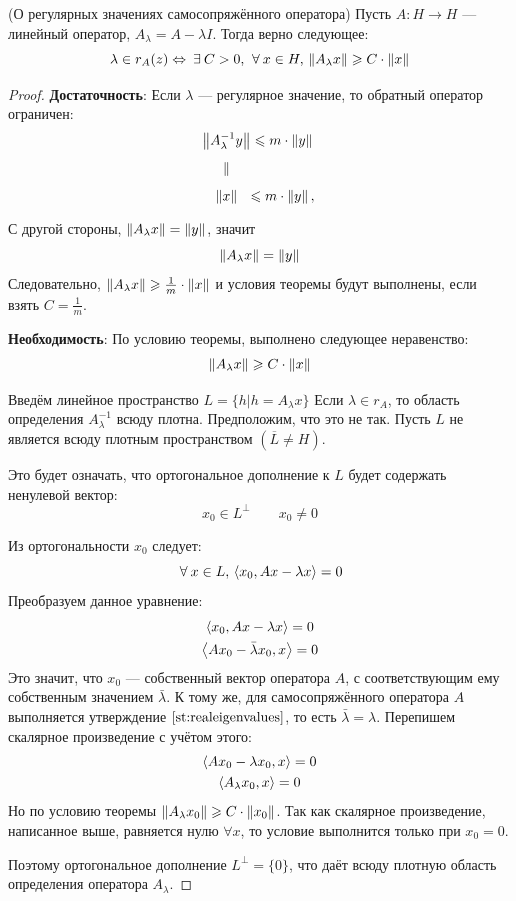\documentclass[12pt]{article}
\begin{document}
	\begin{theorem}
		(О регулярных значениях самосопряжённого оператора) Пусть $A: H \rightarrow H$ --- линейный оператор, 
		$A_{\lambda} = A - \lambda I$. Тогда верно следующее:
		$$\lambda \in r_{A}(z) \Leftrightarrow \exists C > 0,\, \forall x \in H,\, \norm{A_{\lambda}x} \geq C\cdot\norm{x}$$
	\end{theorem}
	\begin{proof}
		\textbf{Достаточность}: 
		Если $\lambda$ --- регулярное значение, то обратный оператор ограничен:
		$$
		\begin{CD}
			\norm{A_{\lambda}^{-1}y} @.\leq m\cdot\norm{y} \\
			\parallel \\		
			\norm{x} @.\leq m\cdot\norm{y},\,
		\end{CD}
		$$
		
		С другой стороны, $\left\| A_{\lambda}x \right\| = \left\| y \right\|$, значит
		$$\left\| A_{\lambda}x \right\| = \left\| y \right\|$$
		Следовательно, $\left\| A_{\lambda}x \right\|\geqslant\frac{1}{m}\cdot\left\| x \right\|$ и условия теоремы будут выполнены, если взять
		$C = \frac{1}{m}$.
		
		\textbf{Необходимость}: 
		По условию теоремы, выполнено следующее неравенство:
		$$\left\| A_{\lambda}x \right\| \geqslant C\cdot\left\| x \right\|$$
		
		Введём линейное пространство $L = \{ h|h=A_{\lambda}x\}$ Если $\lambda \in r_A$, то область определения
		$A_{\lambda}^{-1}$ всюду плотна. Предположим, что это не так. Пусть $L$ не 
		является всюду плотным пространством $\left(\overline{L}\neq H\right)$.
		
		Это будет означать, что ортогональное дополнение к $L$ будет содержать ненулевой вектор:
		$$x_0 \in L^{\perp} \qquad x_0 \neq 0$$
		
		Из ортогональности $x_0$ следует:
		$$\forall x\in L,\, \scal{x_0}{Ax - \lambda x} = 0$$
		Преобразуем данное уравнение:
		\begin{gather*}
			\left\langle x_0, Ax - \lambda x \right\rangle = 0 \\
			\left\langle Ax_0 - \bar{\lambda} x_0, x \right\rangle = 0 \\
		\end{gather*}
		Это значит, что $x_0$ --- собственный вектор оператора $A$, с соответствующим ему собственным значением $\bar{\lambda}$.
		К тому же, для самосопряжённого оператора $A$ выполняется утверждение $\ref{st:realeigenvalues}$, то есть 
		$\bar{\lambda} = \lambda$. Перепишем скалярное произведение с учётом этого:
		\begin{gather*}
			\left\langle Ax_0 - \lambda x_0, x \right\rangle = 0 \\
			\left\langle A_{\lambda} x_0, x \right\rangle = 0
		\end{gather*}
		Но по условию теоремы $\left\| A_{\lambda}x_0 \right\| \geqslant C\cdot\left\| x_0 \right\|$. Так как скалярное произведение, 
		написанное выше, равняется нулю $\forall x$, то условие выполнится только при $x_0 = 0$. 
		
		Поэтому ортогональное дополнение $L^{\perp} = \{0\}$, что даёт всюду плотную область определения оператора $A_{\lambda}$.
	\end{proof}
	
\end{document}

